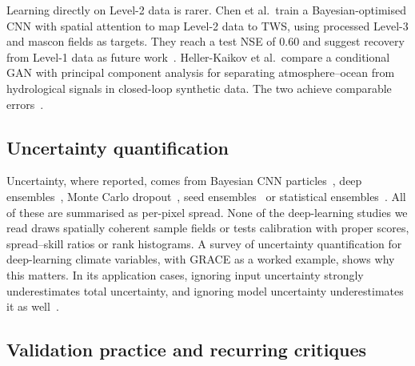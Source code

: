 Learning directly on Level-2 data is rarer. Chen et al.\ train a Bayesian-optimised CNN with spatial attention to map Level-2 data to TWS, using processed Level-3 and mascon fields as targets. They reach a test NSE of 0.60 and suggest recovery from Level-1 data as future work~\cite{chen2025efficient}. Heller-Kaikov et al.\ compare a conditional GAN with principal component analysis for separating atmosphere--ocean from hydrological signals in closed-loop synthetic data. The two achieve comparable errors~\cite{hellerkaikov2023signal}.

\subsection{Uncertainty quantification}

Uncertainty, where reported, comes from Bayesian CNN particles~\cite{mo2022bayesian,mo2025nearrealtime}, deep ensembles~\cite{gou2024global}, Monte Carlo dropout~\cite{uz2026dynamic}, seed ensembles~\cite{li2026physically} or statistical ensembles~\cite{humphrey2019gracerec}. All of these are summarised as per-pixel spread. None of the deep-learning studies we read draws spatially coherent sample fields or tests calibration with proper scores, spread--skill ratios or rank histograms. A survey of uncertainty quantification for deep-learning climate variables, with GRACE as a worked example, shows why this matters. In its application cases, ignoring input uncertainty strongly underestimates total uncertainty, and ignoring model uncertainty underestimates it as well~\cite{gou2026uncertainty}.

\subsection{Validation practice and recurring critiques}

